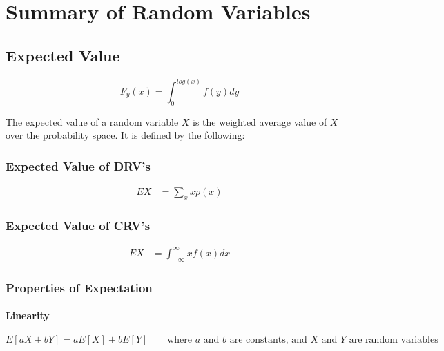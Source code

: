 \section{Summary of Random Variables}
\subsection{Expected Value}

$$F_y(x) = \int_{0}^{log(x)}f(y)dy$$

The expected value of a random variable $X$ is the weighted average value of $X$ over the probability space. It is defined by the following:
\begin{paracol}{2}
    \subsubsection{Expected Value of DRV's}
    \syncallcounters
    \begin{equation*}
    \begin{aligned}
        EX &= \sum_{x}xp(x)
    \end{aligned}
    \end{equation*}

    \switchcolumn \subsubsection{Expected Value of CRV's}
    \syncallcounters
    \begin{equation*}
    \begin{aligned}
        EX &= \int_{-\infty}^{\infty}xf(x)dx
    \end{aligned}
    \end{equation*}

\end{paracol}

\subsubsection{Properties of Expectation}
\paragraph{Linearity}
$$E[aX+bY] = aE[X] + bE[Y] \qquad \text{where $a$ and $b$ are constants, and $X$ and $Y$ are random variables}$$

